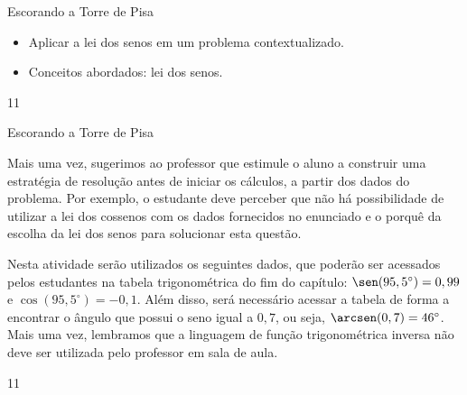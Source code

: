 \clearmargin
\begin{objectives}{Escorando a Torre de Pisa}
{
\begin{itemize}
\item Aplicar a lei dos senos em um problema contextualizado.

\item Conceitos abordados: lei dos senos.
\end{itemize}

}{1}{1}
\end{objectives}
\begin{sugestions}{Escorando a Torre de Pisa}
{
Mais uma vez, sugerimos ao professor que estimule o aluno a construir uma estratégia de resolução antes de iniciar os cálculos, a partir dos dados do problema. Por exemplo, o estudante deve perceber que não há possibilidade de utilizar a lei dos cossenos com os dados fornecidos no enunciado e o porquê da escolha da lei dos senos para solucionar esta questão.

Nesta atividade serão utilizados os seguintes dados, que poderão ser acessados pelos estudantes na tabela trigonométrica do fim do capítulo: $\sen(95,5^\circ)=0,99$ e  $\cos(95,5^\circ)=-0,1$. Além disso, será necessário acessar a tabela de forma a encontrar o ângulo que possui o seno igual a $0,7$, ou seja, $\arcsen({0,7}) = 46^\circ$. Mais uma vez, lembramos que a linguagem de função trigonométrica inversa não deve ser utilizada pelo professor em sala de aula.
}{1}{1}
\end{sugestions}
